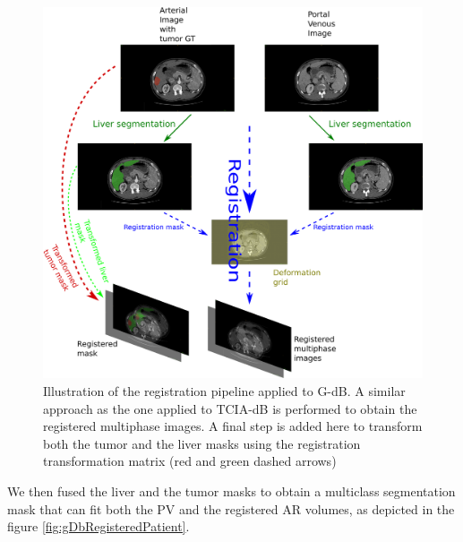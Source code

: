 \documentclass[]{article}
\newcommand{\lmttfont}[1]{{\fontfamily{lmtt}\selectfont #1}}
\begin{document}
\begin{figure}[th!]
\centering
\includegraphics[width=0.9\linewidth]{images/GDB/GDB_registration_pipeline_vertical}
\caption{Illustration of the registration pipeline applied to \lmttfont{G-dB}. A similar approach as the one applied to \lmttfont{TCIA-dB} is performed to obtain the registered multiphase images. A final step is added here to transform both the tumor and the liver masks using the registration transformation matrix (red and green dashed arrows)}
\label{fig:GDB_registration_pipeline_vertical}
\end{figure}

We then fused the liver and the tumor masks to obtain a multiclass
segmentation mask that can fit both the PV and the registered AR volumes, as depicted in the figure \ref{fig:gDbRegisteredPatient}.
\end{document}
